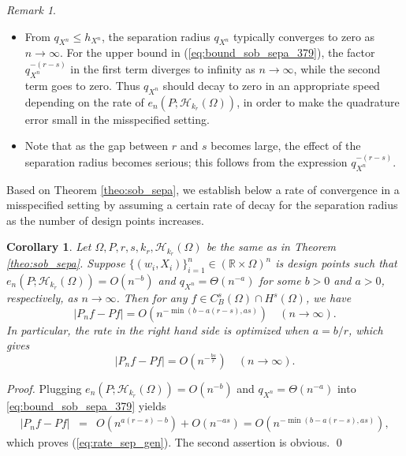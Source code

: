 \documentclass[11pt]{article}
\newtheorem{corollary}[theorem]{Corollary}
\theoremstyle{remark}
\newtheorem{remark}{Remark}
\theoremstyle{example}
\theoremstyle{remark}
\renewcommand{\H}{{\mathcal{H}}}
\newcommand{\R}{\mathbb{R}}
\begin{document}
\begin{remark}
\begin{itemize}
\item
From $q_{X^n} \leq h_{X^n}$, the separation radius $q_{X^n}$ typically converges to zero as $n\to\infty$.  For the upper bound in (\ref{eq:bound_sob_sepa_379}), the factor $q_{X^n}^{-(r-s)}$ in the first term diverges to infinity as $n\to \infty$, while the second term goes to zero.  
Thus $q_{X^n}$ should decay to zero in an appropriate speed depending on the rate of $e_n(P;\H_{k_r}(\Omega))$, in order to make the quadrature error small in the misspecified setting. 
\vspace{-1mm}

\item
Note that as the gap between $r$ and $s$ becomes large, the effect of the separation radius becomes serious; this follows from the expression $q_{X^n}^{-(r-s)}$.


\end{itemize}%
\end{remark}

Based on Theorem \ref{theo:sob_sepa}, we establish below a rate of convergence in a misspecified setting by assuming a certain rate of decay for the separation radius as the number of design points increases. 
\begin{corollary} \label{coro:sob_sepa}
Let $\Omega, P, r, s, k_r, \H_{k_r}(\Omega)$ be the same as in Theorem \ref{theo:sob_sepa}. 
Suppose $\{ (w_i,X_i) \}_{i=1}^n \in (\R \times \Omega)^n$ is design points such that $e_n(P;\H_{k_r}(\Omega)) = O(n^{-b})$ and $q_{X^n} = \Theta(n^{-a})$ for some $b>0$ and $a > 0$, respectively, as $n \to \infty$.
%
Then for any $f \in C_B^s (\Omega) \cap H^s (\Omega)$, we have
\begin{equation} \label{eq:rate_sep_gen}
| P_n f - P f | = O(n^{- \min( b - a(r-s), as)} ) \quad (n \to \infty).
\end{equation}
In particular, the rate in the right hand side is optimized when $a = b/r$, which gives 
\begin{equation} \label{eq:rate_sobs}
| P_n f - P f | = O(n^{-\frac{bs}{r}}) \quad (n \to \infty).
\end{equation}%
\end{corollary}
\begin{proof}
Plugging $e_n(P;\H_{k_r}(\Omega)) = O(n^{-b})$ and $q_{X^n} = \Theta(n^{-a})$ into \eqref{eq:bound_sob_sepa_379} yields 
\begin{eqnarray*}
\left| P_n f - Pf \right| 
&= & O(n^{a (r-s) -b }) + O(n^{-as})= O(n^{- \min( b - a(r-s), as)} ),
\end{eqnarray*}
which proves (\ref{eq:rate_sep_gen}).  The second assertion is obvious. \qed 
\end{proof}
\end{document}
